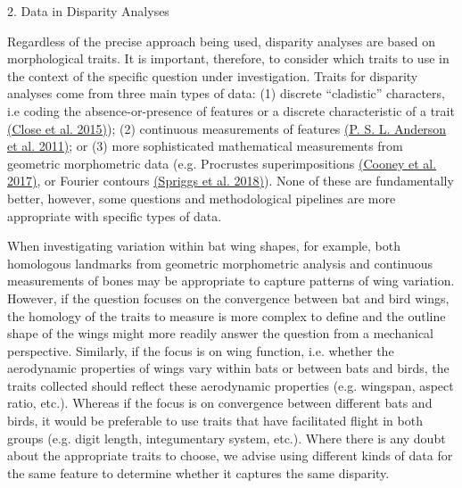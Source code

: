 2. Data in Disparity Analyses

Regardless of the precise approach being used, disparity analyses are
based on morphological traits. It is important, therefore, to consider
which traits to use in the context of the specific question under
investigation. Traits for disparity analyses come from three main types
of data: (1) discrete ``cladistic'' characters, i.e coding the
absence-or-presence of features or a discrete characteristic of a trait
\href{https://paperpile.com/c/sTGYvp/PbSx}{(Close et al. 2015)}); (2)
continuous measurements of features
\href{https://paperpile.com/c/sTGYvp/qjj9}{(P. S. L. Anderson et al.
2011)}; or (3) more sophisticated mathematical measurements from
geometric morphometric data (e.g. Procrustes superimpositions
\href{https://paperpile.com/c/sTGYvp/RjqE}{(Cooney et al. 2017)}, or
Fourier contours \href{https://paperpile.com/c/sTGYvp/ZEDR}{(Spriggs et
al. 2018)}). None of these are fundamentally better, however, some
questions and methodological pipelines are more appropriate with
specific types of data.

When investigating variation within bat wing shapes, for example, both
homologous landmarks from geometric morphometric analysis and continuous
measurements of bones may be appropriate to capture patterns of wing
variation. However, if the question focuses on the convergence between
bat and bird wings, the homology of the traits to measure is more
complex to define and the outline shape of the wings might more readily
answer the question from a mechanical perspective. Similarly, if the
focus is on wing function, i.e. whether the aerodynamic properties of
wings vary within bats or between bats and birds, the traits collected
should reflect these aerodynamic properties (e.g. wingspan, aspect
ratio, etc.). Whereas if the focus is on convergence between different
bats and birds, it would be preferable to use traits that have
facilitated flight in both groups (e.g. digit length, integumentary
system, etc.). Where there is any doubt about the appropriate traits to
choose, we advise using different kinds of data for the same feature to
determine whether it captures the same disparity.

